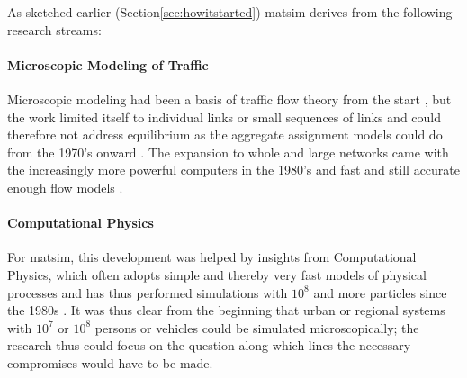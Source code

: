 As sketched earlier 
(Section\ref{sec:howitstarted})
\gls{matsim} derives from the following research streams:

\paragraph{Microscopic Modeling of Traffic} 
Microscopic modeling had been 
a basis of traffic flow 
theory from the start 
\citep[e.g.,][]{theGang,Seddon_Simulation_1972,Wiedemann_PhDThesis_1974}, but the work 
limited itself to individual links or small sequences of links and could therefore not address equilibrium as the aggregate assignment models could do from the 1970’s onward \citep[see][]{Sheffi_1985,OrtuzarWillumsen_2011}. The expansion to whole and large networks came with the increasingly more powerful computers in the 1980’s and fast and still accurate enough flow models \citep[e.g.,][]{Schwerdtfeger_VolmulerHamerslag_1984, NagelSchreckenberg1992CA, Daganzo_TransResPartB_1994,Gawron_IJMPC_1998}.

\paragraph{Computational Physics} 
For \gls{matsim}, this development was helped by insights from Computational Physics, which often adopts simple and thereby very fast models of physical processes and has thus performed simulations with $10^8$ and more particles since the 1980s \citep[for a contemporary review see][]{BeazleyEtcMolec-dyn}.
It was thus clear from the beginning that urban or regional systems with $10^7$ or $10^8$ persons or vehicles could be simulated microscopically; the research thus could focus on the question along which lines the necessary compromises would have to be made.

